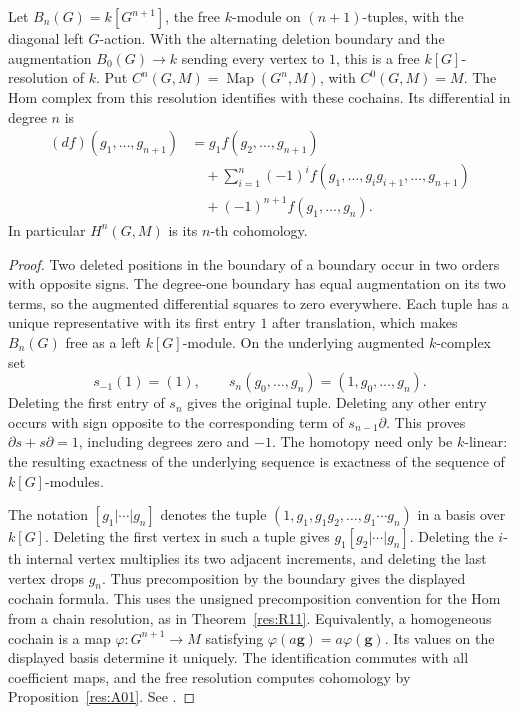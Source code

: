 \begin{theorem}
\label{res:A02}
Let \(B_n(G)=k[G^{n+1}]\), the free \(k\)-module on \((n+1)\)-tuples,
with the diagonal left \(G\)-action. With the alternating deletion
boundary and the augmentation \(B_0(G)\to k\) sending every vertex
to \(1\), this is a free \(k[G]\)-resolution of \(k\). Put
\(C^n(G,M)=\operatorname{Map}(G^n,M)\), with \(C^0(G,M)=M\).
The Hom complex from this resolution identifies with these cochains.
Its differential in degree \(n\) is
\begin{align*}
 (df)(g_1,\ldots,g_{n+1})
  &=g_1 f(g_2,\ldots,g_{n+1})\\
  &\quad+\sum_{i=1}^{n}(-1)^i
          f(g_1,\ldots,g_i g_{i+1},\ldots,g_{n+1})\\
  &\quad+(-1)^{n+1} f(g_1,\ldots,g_n).
\end{align*}
In particular \(H^n(G,M)\) is its \(n\)-th cohomology.
\end{theorem}

\begin{proof}
Two deleted positions in the boundary of a boundary occur in two
orders with opposite signs. The degree-one boundary has equal
augmentation on its two terms, so the augmented differential squares to
zero everywhere. Each tuple has a unique representative with its first
entry \(1\) after translation, which makes \(B_n(G)\) free as a left
\(k[G]\)-module. On the underlying augmented \(k\)-complex set
\[
 s_{-1}(1)=(1),\qquad
 s_n(g_0,\ldots,g_n)=(1,g_0,\ldots,g_n).
\]
Deleting the first entry of \(s_n\) gives the original tuple.
Deleting any other entry occurs with sign opposite to the corresponding
term of \(s_{n-1}\partial\). This proves \(\partial s+s\partial=1\),
including degrees zero and \(-1\). The homotopy need only be
\(k\)-linear: the resulting exactness of the underlying sequence is
exactness of the sequence of \(k[G]\)-modules.

The notation \([g_1|\cdots|g_n]\) denotes the tuple
\((1,g_1,g_1g_2,\ldots,g_1\cdots g_n)\) in a basis over \(k[G]\).
Deleting the first vertex in such a tuple gives
\(g_1[g_2|\cdots|g_n]\). Deleting the \(i\)-th internal vertex
multiplies its two adjacent increments, and deleting the last
vertex drops \(g_n\). Thus precomposition by the boundary gives
the displayed cochain formula. This uses the unsigned
precomposition convention for the Hom from a chain resolution,
as in Theorem~\ref{res:R11}. Equivalently, a homogeneous
cochain is a map \(\varphi:G^{n+1}\to M\) satisfying
\(\varphi(a\boldsymbol g)=a\varphi(\boldsymbol g)\).
Its values on the displayed basis determine it uniquely. The
identification commutes with all coefficient maps, and the free
resolution computes cohomology by Proposition~\ref{res:A01}.
See \cite[Sections 6.5.1--6.5.6]{weibel}.
\end{proof}

